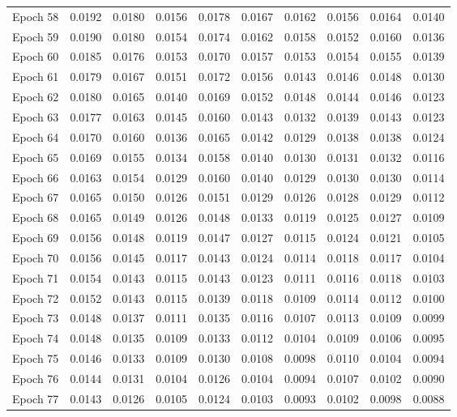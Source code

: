 \begin{table}[htbp]
\begin{tabular}{|l|l|l|l|l|l|l|l|l|l|}
Epoch 58 & 0.0192 & 0.0180 & 0.0156 & 0.0178 & 0.0167 & 0.0162 & 0.0156 & 0.0164 & 0.0140  \\
Epoch 59 & 0.0190 & 0.0180 & 0.0154 & 0.0174 & 0.0162 & 0.0158 & 0.0152 & 0.0160 & 0.0136  \\
Epoch 60 & 0.0185 & 0.0176 & 0.0153 & 0.0170 & 0.0157 & 0.0153 & 0.0154 & 0.0155 & 0.0139  \\
Epoch 61 & 0.0179 & 0.0167 & 0.0151 & 0.0172 & 0.0156 & 0.0143 & 0.0146 & 0.0148 & 0.0130  \\
Epoch 62 & 0.0180 & 0.0165 & 0.0140 & 0.0169 & 0.0152 & 0.0148 & 0.0144 & 0.0146 & 0.0123  \\
Epoch 63 & 0.0177 & 0.0163 & 0.0145 & 0.0160 & 0.0143 & 0.0132 & 0.0139 & 0.0143 & 0.0123  \\
Epoch 64 & 0.0170 & 0.0160 & 0.0136 & 0.0165 & 0.0142 & 0.0129 & 0.0138 & 0.0138 & 0.0124  \\
Epoch 65 & 0.0169 & 0.0155 & 0.0134 & 0.0158 & 0.0140 & 0.0130 & 0.0131 & 0.0132 & 0.0116  \\
Epoch 66 & 0.0163 & 0.0154 & 0.0129 & 0.0160 & 0.0140 & 0.0129 & 0.0130 & 0.0130 & 0.0114  \\
Epoch 67 & 0.0165 & 0.0150 & 0.0126 & 0.0151 & 0.0129 & 0.0126 & 0.0128 & 0.0129 & 0.0112  \\
Epoch 68 & 0.0165 & 0.0149 & 0.0126 & 0.0148 & 0.0133 & 0.0119 & 0.0125 & 0.0127 & 0.0109  \\
Epoch 69 & 0.0156 & 0.0148 & 0.0119 & 0.0147 & 0.0127 & 0.0115 & 0.0124 & 0.0121 & 0.0105  \\
Epoch 70 & 0.0156 & 0.0145 & 0.0117 & 0.0143 & 0.0124 & 0.0114 & 0.0118 & 0.0117 & 0.0104  \\
Epoch 71 & 0.0154 & 0.0143 & 0.0115 & 0.0143 & 0.0123 & 0.0111 & 0.0116 & 0.0118 & 0.0103  \\
Epoch 72 & 0.0152 & 0.0143 & 0.0115 & 0.0139 & 0.0118 & 0.0109 & 0.0114 & 0.0112 & 0.0100  \\
Epoch 73 & 0.0148 & 0.0137 & 0.0111 & 0.0135 & 0.0116 & 0.0107 & 0.0113 & 0.0109 & 0.0099  \\
Epoch 74 & 0.0148 & 0.0135 & 0.0109 & 0.0133 & 0.0112 & 0.0104 & 0.0109 & 0.0106 & 0.0095  \\
Epoch 75 & 0.0146 & 0.0133 & 0.0109 & 0.0130 & 0.0108 & 0.0098 & 0.0110 & 0.0104 & 0.0094  \\
Epoch 76 & 0.0144 & 0.0131 & 0.0104 & 0.0126 & 0.0104 & 0.0094 & 0.0107 & 0.0102 & 0.0090  \\
Epoch 77 & 0.0143 & 0.0126 & 0.0105 & 0.0124 & 0.0103 & 0.0093 & 0.0102 & 0.0098 & 0.0088  \\

\end{tabular}
\end{table}
